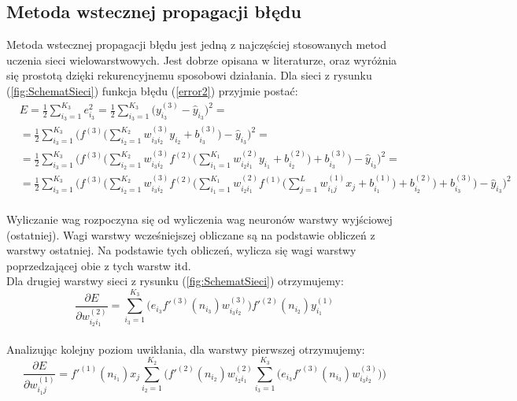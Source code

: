 \documentclass[a4paper, openright, twoside,11pt]{article}
\begin{document}
    \clearpage
    \subsection{Metoda wstecznej propagacji błędu}
    Metoda wstecznej propagacji błędu jest jedną z najczęściej stosowanych metod uczenia sieci wielowarstwowych. Jest dobrze opisana w literaturze, oraz wyróżnia się prostotą dzięki rekurencyjnemu sposobowi działania. Dla sieci z rysunku (\ref{fig:SchematSieci}) funkcja błędu (\ref{error2}) przyjmie postać:\\[0.2cm]
\begin{equation}
\begin{aligned}
    &E = \frac{1}{2} \sum_{i_{3}=1}^{K_3}e^{2}_{i_3} = \frac{1}{2}  \sum_{i_{3}=1}^{K_3}
    \Big(y^{(3)}_{i_3}-\hat y_{i_3}
    \Big)^{2} = \\
    &=\frac{1}{2}  \sum_{i_{3}=1}^{K_3}
    \Bigg( f^{(3)} 
    \Bigg(  \sum_{i_{2}=1}^{K_2}w^{(3)}_{i_3 i_2}y_{i_2}+b^{(3)}_{i_3}
    \Bigg)  -\hat y_{i_3}
    \Bigg)^{2} = \\
    &=\frac{1}{2}  \sum_{i_{3}=1}^{K_3}
    \Bigg( f^{(3)} 
    \Bigg( \sum_{i_{2}=1}^{K_2}w^{(3)}_{i_3 i_2} f^{(2)} 
    \Bigg( \sum_{i_{1}=1}^{K_1}w^{(2)}_{i_2 i_1} y_{i_1}+b^{(2)}_{i_2}
    \Bigg) +b^{(3)}_{i_3} 
    \Bigg) -\hat y_{i_3}
    \Bigg)^{2} = \\
    &=\frac{1}{2}  \sum_{i_{3}=1}^{K_3}
    \Bigg( f^{(3)} 
    \Bigg( \sum_{i_{2}=1}^{K_2}w^{(3)}_{i_3 i_2} f^{(2)}
    \Bigg( \sum_{i_{1}=1}^{K_1}w^{(2)}_{i_2 i_1} f^{(1)}
    \Bigg( \sum_{j=1}^{L}w^{(1)}_{i_1 j}x_{j} + b^{(1)}_{i_1}
    \Bigg) +b^{(2)}_{i_2}
    \Bigg) +b^{(3)}_{i_3} 
    \Bigg) -\hat y_{i_3}
    \Bigg)^{2}
\end{aligned}
\end{equation}\\
    Wyliczanie wag rozpoczyna się od wyliczenia wag neuronów warstwy wyjściowej (ostatniej). Wagi warstwy wcześniejszej obliczane są na podstawie obliczeń z warstwy ostatniej. Na podstawie tych obliczeń, wylicza się wagi warstwy poprzedzającej obie z tych warstw itd.\\
    Dla drugiej warstwy sieci z rysunku (\ref{fig:SchematSieci}) otrzymujemy:\\[0.2cm]
    \begin{equation}
    \frac{\partial E}{\partial w^{(2)}_{i_2i_1}} = \sum_{i_{3}=1}^{K_3}\Big(e_{i_3} f'^{(3)}(n_{i_3}) w^{(3)}_{i_3 i_2}\Big)
    f'^{(2)}(n_{i_2}) y^{(1)}_{i_1}
    \end{equation}\\[0.2cm]
    Analizując kolejny poziom uwikłania, dla warstwy pierwszej otrzymujemy:\\[0.2cm]
    \begin{equation}
     \frac{\partial E}{\partial w^{(1)}_{i_1j}} = f'^{(1)}(n_{i_1}) x_j 
    \sum_{i_{2}=1}^{K_2}\Bigg( f'^{(2)}(n_{i_2}) w^{(2)}_{i_2 i_1}
     \sum_{i_{3}=1}^{K_3}\bigg(e_{i_3} f'^{(3)}(n_{i_3}) w^{(3)}_{i_3 i_2}   \bigg)\Bigg)
    \end{equation}
    \clearpage
\end{document}
